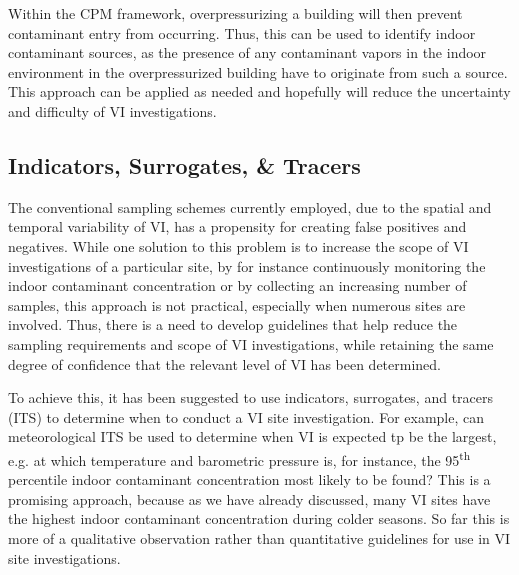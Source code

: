 Within the CPM framework, overpressurizing a building will then prevent contaminant entry from occurring.
Thus, this can be used to identify indoor contaminant sources, as the presence of any contaminant vapors in the indoor environment in the overpressurized building have to originate from such a source.
This approach can be applied as needed and hopefully will reduce the uncertainty and difficulty of VI investigations\cite{mchugh_evaluation_2012}.\par

\subsection{Indicators, Surrogates, \& Tracers}

The conventional sampling schemes currently employed, due to the spatial and temporal variability of VI, has a propensity for creating false positives and negatives.
While one solution to this problem is to increase the scope of VI investigations of a particular site, by for instance continuously monitoring the indoor contaminant concentration or by collecting an increasing number of samples, this approach is not practical, especially when numerous sites are involved.
Thus, there is a need to develop guidelines that help reduce the sampling requirements and scope of VI investigations, while retaining the same degree of confidence that the relevant level of VI has been determined\cite{schuver_chlorinated_2018}.\par

To achieve this, it has been suggested to use indicators, surrogates, and tracers (ITS) to determine when to conduct a VI site investigation.
For example, can meteorological ITS be used to determine when VI is expected tp be the largest, e.g. at which temperature and barometric pressure is, for instance, the 95\textsuperscript{th} percentile indoor contaminant concentration most likely to be found\cite{schuver_chlorinated_2018}?
This is a promising approach, because as we have already discussed, many VI sites have the highest indoor contaminant concentration during colder seasons.
So far this is more of a qualitative observation rather than quantitative guidelines for use in VI site investigations.\par
